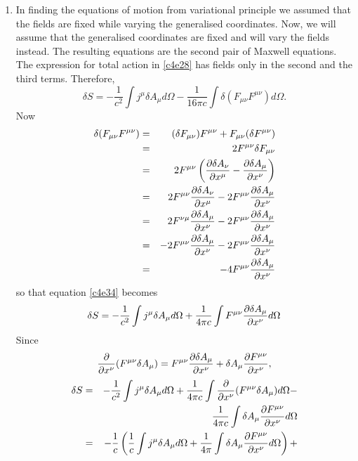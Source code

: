 \begin{enumerate}
\item In finding the equations of motion from variational principle we assumed
that the fields are fixed while varying the generalised coordinates. Now, we 
will assume that the generalised coordinates are fixed and will vary the fields
instead. The resulting equations are the second pair of Maxwell equations. The 
expression for total action in \eqref{c4e28} has fields only in the second and 
the third terms. Therefore,
\begin{equation}\label{c4e34}
\delta S = -\frac{1}{c^2}\int j^\mu \delta A_\mu d\Omega - \frac{1}{16\pi c}
\int\delta(F_{\mu\nu}F^{\mu\nu})d\Omega.
\end{equation}
Now 
\begin{eqnarray*}
\delta(F_{\mu\nu}F^{\mu\nu}) &=& (\delta F_{\mu\nu})F^{\mu\nu} + 
F_{\mu\nu} (\delta F^{\mu\nu}) \\
 &=& 2F^{\mu\nu}\delta F_{\mu\nu} \\
 &=& 2F^{\mu\nu}\left(\frac{\partial{\delta A_\nu}}{\partial{x^\mu}} - 
 \frac{\partial{\delta A_\mu}}{\partial{x^\nu}}\right) \\
 &=& 2F^{\mu\nu}\frac{\partial{\delta A_\nu}}{\partial{x^\mu}} - 
 	2F^{\mu\nu}\frac{\partial{\delta A_\mu}}{\partial{x^\nu}} \\
 &=& 2F^{\nu\mu}\frac{\partial{\delta A_\mu}}{\partial{x^\nu}} - 
 	2F^{\mu\nu}\frac{\partial{\delta A_\mu}}{\partial{x^\nu}} \\
 &=& -2F^{\mu\nu}\frac{\partial{\delta A_\mu}}{\partial{x^\nu}} - 
 	2F^{\mu\nu}\frac{\partial{\delta A_\mu}}{\partial{x^\nu}} \\
 &=& -4F^{\mu\nu}\frac{\partial{\delta A_\mu}}{\partial{x^\nu}}
\end{eqnarray*}
so that equation \eqref{c4e34} becomes
\begin{equation}\label{c4e35}
\delta S = -\frac{1}{c^2}\int j^\mu \delta A_\mu d\Omega + \frac{1}{4\pi c}
\int F^{\mu\nu}\frac{\partial{\delta A_\mu}}{\partial{x^\nu}} d\Omega
\end{equation}
Since 
\[
\frac{\partial}{\partial x^\nu}(F^{\mu\nu} \delta A_\mu) =
F^{\mu\nu}\frac{\partial{\delta A_\mu}}{\partial{x^\nu}} + \delta A_\mu\frac{\partial{F^{\mu\nu}}}{\partial{x^\nu}},
\]
\begin{eqnarray}
\delta S &=& -\frac{1}{c^2}\int j^\mu \delta A_\mu d\Omega + 
\frac{1}{4\pi c}\int \frac{\partial}{\partial x^\nu}(F^{\mu\nu} \delta A_\mu) 
d\Omega - \nonumber \\
 & & \frac{1}{4\pi c}\int\delta A_\mu\pdt{F^{\mu\nu}}{x^\nu}d\Omega\nonumber \\
 &=& -\frac{1}{c}\left(\frac{1}{c}\int j^\mu \delta A_\mu d\Omega + 
    \frac{1}{4\pi} \int\delta A_\mu\pdt{F^{\mu\nu}}{x^\nu}d\Omega\right) + 
	\nonumber \\

\end{eqnarray}
\end{enumerate}
